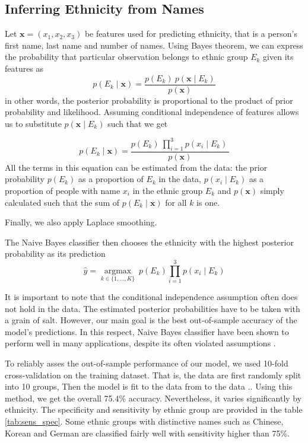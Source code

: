 \subsection{Inferring Ethnicity from Names}
Let  $\boldsymbol{x} = \left(x_1, x_2, x_3\right)$ be features used for predicting ethnicity, that is a person's first name, last name and number of names. Using Bayes theorem, we can express the probability that particular observation  belongs to ethnic group $E_k$ given its features as
\begin{equation*}
p(E_k \mid \mathbf{x}) = \frac{p(E_k) \ p(\mathbf{x} \mid E_k)}{p(\mathbf{x})}
\end{equation*}
in other words, the posterior probability is proportional to the product of prior probability and likelihood. 
Assuming conditional independence of features allows us to substitute $p(\mathbf{x} \mid E_k)$ such that we get

\begin{equation*}
p(E_k \mid \mathbf{x}) = \frac{p(E_k) \  \prod_{i=1}^3 p(x_i \mid E_k)\,}{p(\mathbf{x})}
\end{equation*}
All the terms in this equation can be estimated from the data: the prior probability $p(E_k)$ as a proportion of $E_k$ in the data, $p(x_i \mid E_k)$ as a proportion of people with name $x_i$ in the ethnic group $E_k$ and $p(\mathbf{x})$ simply calculated such that the sum of $p(E_k \mid \mathbf{x})$ for all $k$ is one.

Finally, we also apply Laplace smoothing. 

The Naive Bayes classifier then chooses the ethnicity with the highest posterior probability as its prediction
\begin{equation*}
    \hat{y} = \underset{k \in \{1, \dots, K\}}{\operatorname{argmax}} \ p(E_k) \displaystyle\prod_{i=1}^{3} p(x_i \mid E_k)
\end{equation*}


It is important to note that the conditional independence assumption often does not hold in the data. The estimated posterior probabilities have to be taken with a grain of salt. %
However, our main goal is the best out-of-sample accuracy of the model's predictions. In this respect, Naive Bayes classifier have been shown to perform  well in many applications, despite its often violated assumptions \citep{domingos_optimality_1997}.


To reliably asses the out-of-sample performance of our model, we used 10-fold cross-validation on the training dataset. That is, the data are first randomly split into 10 groups, Then the model is fit to the data from to the data ..  
Using this method, we get the overall 75.4\% accuracy. Nevertheless, it varies
significantly by ethnicity. The specificity and sensitivity by ethnic group are provided in the table \ref{tab:sens_spec}. Some ethnic groups with distinctive names such as Chinese, Korean and German are classified fairly well with sensitivity higher than 75\%. 


